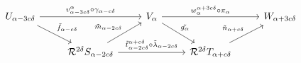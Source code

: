 \begin{equation}\label{dgm:partial_interleaving_rips}
  \begin{tikzcd}
    U_{\alpha-3c\delta}\arrow{rr}{v_{\alpha-3c\delta}^{\alpha}\circ\gamma_{\alpha-c\delta}}\arrow{dr}{\tilde{f}_{\alpha-c\delta}} & &
    V_{\alpha}\arrow{rr}{w_\alpha^{\alpha+3c\of}\circ\pi_\alpha}\arrow{dr}{\tilde{g_\alpha}} & &
    W_{\alpha+3c\of}\\
    & \rips^{2\of}S_{\alpha-2c\of}\arrow{ur}{\tilde{m}_{\alpha-2c\of}}\arrow{rr}{\tilde{t}_{\alpha-2c\of}^{\alpha+c\of}\circ\tilde{\lambda}_{\alpha-2c\of}} & &
    \rips^{2\of}T_{\alpha+c\of}\arrow{ur}{\tilde{n}_{\alpha+c\of}} &
\end{tikzcd}\end{equation}
